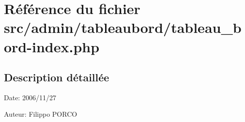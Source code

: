 \section{Référence du fichier src/admin/tableaubord/tableau\_\-bord-index.php}
\label{tableau__bord-index_8php}


\subsection{Description détaillée}
\begin{Desc}
\item[Date:]2006/11/27\end{Desc}
\begin{Desc}
\item[Auteur:]Filippo PORCO \end{Desc}


